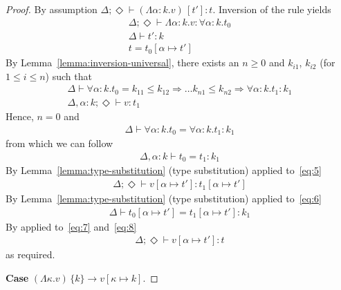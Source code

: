 \documentclass{article}
\newcommand{\KVAR}{\kappa}
\newcommand{\TASS}[1]{#1\colon\!}
\newcommand{\TVAR}{\alpha}
\newcommand{\TALL}[2]{\forall\TASS{#1}#2.}
\newcommand{\TLAM}[2]{\Lambda\TASS{#1}#2.}
\newcommand{\TAPP}[2]{#1\,[#2]}
\newcommand{\KLAM}[1]{\Lambda#1.}
\newcommand{\KAPP}[2]{#1\,\{#2\}}
\newcommand{\KENV}{\Delta}
\newcommand{\TENVEMPTY}{\Diamond}
\newcommand\stepsto{\longrightarrow}
\begin{document}
\begin{proof}
  By assumption
  $\KENV;\TENVEMPTY \vdash \TAPP{(\TLAM \TVAR k v)}{t'} :
  t$. Inversion of the  rule yields
  \begin{gather}
    \KENV; \TENVEMPTY \vdash \TLAM \TVAR k v : \TALL\TVAR k t_0 \\
    \KENV \vdash t' : k \\
    t = t_0 [\TVAR\mapsto t']
  \end{gather}
  By Lemma~\ref{lemma:inversion-universal}, there exists an $n\ge0$ and $k_{i1}$, $k_{i2}$ (for $1\le i\le n$) such that
  \begin{gather}
    \KENV \vdash \TALL\TVAR k t_0 = k_{11}\le k_{12}\Rightarrow \dots k_{n1}\le k_{n2} \Rightarrow \TALL\TVAR k t_1 : k_1
    \\
    \label{eq:5}
    \KENV, \TASS \TVAR{k}; \TENVEMPTY \vdash v : t_1
  \end{gather}
  Hence, $n=0$ and
  \begin{gather}
    \KENV \vdash \TALL\TVAR k t_0 = \TALL\TVAR k t_1 : k_1
  \end{gather}
  from which we can follow
  \begin{gather}
    \label{eq:6}
    \KENV, \TASS\TVAR k \vdash t_0 = t_1 : k_1
  \end{gather}
  By Lemma~\ref{lemma:type-substitution} (type substitution) applied to~\eqref{eq:5}
  \begin{gather}
    \label{eq:7}
    \KENV; \TENVEMPTY \vdash v[\TVAR \mapsto t'] : t_1[\TVAR \mapsto t']
  \end{gather}
  By Lemma~\ref{lemma:type-substitution} (type substitution) applied to~\eqref{eq:6}
  \begin{gather}
    \label{eq:8}
    \KENV \vdash t_0[\TVAR \mapsto t'] = t_1[\TVAR \mapsto t'] : k_1
  \end{gather}
  By  applied to~\eqref{eq:7} and~\eqref{eq:8}
  \begin{gather}
    \KENV; \TENVEMPTY \vdash v[\TVAR \mapsto t'] : t
  \end{gather}
  as required.

  \textbf{Case} $\KAPP{(\KLAM \KVAR v)}k \stepsto v[\KVAR \mapsto k]$.


\end{proof}
\end{document}
